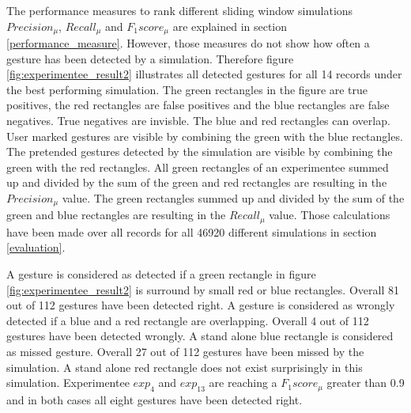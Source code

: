 The performance measures to rank different sliding window simulations $Precision_{\mu}$, $Recall_{\mu}$ and
$F_{1}score_{\mu}$ are explained in section \ref{performance_measure}. However, those measures do not show how often a
gesture has been detected by a simulation. Therefore figure \ref{fig:experimentee_result2} illustrates all detected
gestures for all 14 records under the best performing simulation. The green rectangles in the figure are true positives,
the red rectangles are false positives and the blue rectangles are false negatives. True negatives are invisble. The
blue and red rectangles can overlap. User marked gestures are visible by combining the green with the blue rectangles.
The pretended gestures detected by the simulation are visible by combining the green with the red rectangles. All green
rectangles of an experimentee summed up and divided by the sum of the green and red rectangles are resulting in the
$Precision_{\mu}$ value. The green rectangles summed up and divided by the sum of the green and blue rectangles are
resulting in the $Recall_{\mu}$ value. Those calculations have been made over all records for all 46920 different
simulations in section \ref{evaluation}.

A gesture is considered as detected if a green rectangle in figure \ref{fig:experimentee_result2} is surround by small
red or blue rectangles. Overall 81 out of 112 gestures have been detected right. A gesture is considered as wrongly
detected if a blue and a red rectangle are overlapping. Overall 4 out of 112 gestures have been detected wrongly. A
stand alone blue rectangle is considered as missed gesture. Overall 27 out of 112 gestures have been missed by the
simulation. A stand alone red rectangle does not exist surprisingly in this simulation. Experimentee $exp_4$ and
$exp_{13}$ are reaching a $F_{1}score_{\mu}$ greater than 0.9 and in both cases all eight gestures have been detected
right.

